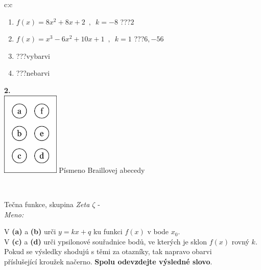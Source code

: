 \documentclass[10pt]{report}
\begin{document}
\begin{tabular}{c:c}
\begin{minipage}[c][104.5mm][t]{0.5\linewidth}
\begin{center}
\begin{minipage}{0.79\linewidth}
\begin{center}
\begin{varwidth}{\linewidth}
\begin{enumerate}
\item $f(x)=8x^2+8x+2\enspace , \enspace k=-8$\quad \dotfill\; ???\;\dotfill \quad $2$
\item $f(x)=x^3-6x^2+10x+1\enspace , \enspace k=1$\quad \dotfill\; ???\;\dotfill \quad $6 , -56$
\item \quad \dotfill\; ???\;\dotfill \quad vybarvi
\item \quad \dotfill\; ???\;\dotfill \quad nebarvi
\end{enumerate}
\end{varwidth}
\end{center}
\end{minipage}
\begin{minipage}{0.20\linewidth}
\begin{center}
{\Huge\bfseries 2.} \\[2mm]
\includegraphics[height=40mm]{../images/braille.png}
{\small Písmeno Braillovej abecedy}
\end{center}
\end{minipage}
\end{center}
\end{minipage}
\\ \hdashline
\begin{minipage}[c][104.5mm][t]{0.5\linewidth}
\begin{center}
\vspace{7mm}
{\huge Tečna funkce, skupina \textit{Zeta $\zeta$} -}\\[5mm]
\textit{Meno:}\phantom{xxxxxxxxxxxxxxxxxxxxxxxxxxxxxxxxxxxxxxxxxxxxxxxxxxxxxxxxxxxxxxxxx}\\[5mm]
\begin{minipage}{0.95\linewidth}
\begin{center}
V \textbf{(a)} a \textbf{(b)} urči  $y = kx + q$ ku funkci $f(x)$ v bode $x_0$.\\V \textbf{(c)} a \textbf{(d)} urči ypsilonové souřadnice bodů, ve kterých je sklon $f(x)$ rovný $k$.\\Pokud se výsledky shodujú s těmi za otazníky, tak napravo obarvi\\příslušející kroužek načerno. \textbf{Spolu odevzdejte výsledné slovo}.

\end{center}
\end{minipage}
\end{center}
\end{minipage}
\end{tabular}
\end{document}
